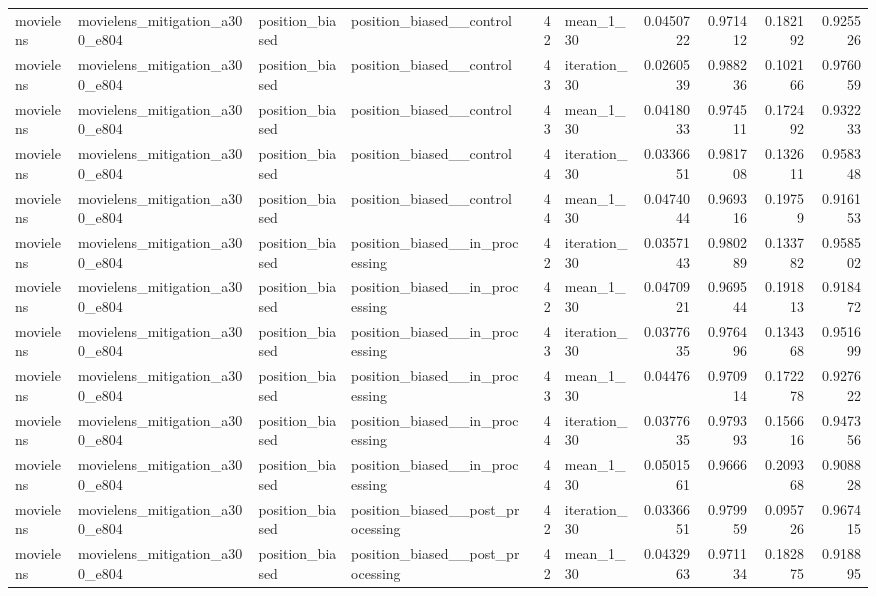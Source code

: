 \begin{table}[htbp!]
\begin{tabular}{llllrlrrrr}
movielens & movielens\_mitigation\_a300\_e804 & position\_biased & position\_biased\_\_control & 42 & mean\_1\_30 & 0.0450722 & 0.971412 & 0.182192 & 0.925526 \\
movielens & movielens\_mitigation\_a300\_e804 & position\_biased & position\_biased\_\_control & 43 & iteration\_30 & 0.0260539 & 0.988236 & 0.102166 & 0.976059 \\
movielens & movielens\_mitigation\_a300\_e804 & position\_biased & position\_biased\_\_control & 43 & mean\_1\_30 & 0.0418033 & 0.974511 & 0.172492 & 0.932233 \\
movielens & movielens\_mitigation\_a300\_e804 & position\_biased & position\_biased\_\_control & 44 & iteration\_30 & 0.0336651 & 0.981708 & 0.132611 & 0.958348 \\
movielens & movielens\_mitigation\_a300\_e804 & position\_biased & position\_biased\_\_control & 44 & mean\_1\_30 & 0.0474044 & 0.969316 & 0.19759 & 0.916153 \\
movielens & movielens\_mitigation\_a300\_e804 & position\_biased & position\_biased\_\_in\_processing & 42 & iteration\_30 & 0.0357143 & 0.980289 & 0.133782 & 0.958502 \\
movielens & movielens\_mitigation\_a300\_e804 & position\_biased & position\_biased\_\_in\_processing & 42 & mean\_1\_30 & 0.0470921 & 0.969544 & 0.191813 & 0.918472 \\
movielens & movielens\_mitigation\_a300\_e804 & position\_biased & position\_biased\_\_in\_processing & 43 & iteration\_30 & 0.0377635 & 0.976496 & 0.134368 & 0.951699 \\
movielens & movielens\_mitigation\_a300\_e804 & position\_biased & position\_biased\_\_in\_processing & 43 & mean\_1\_30 & 0.04476 & 0.970914 & 0.172278 & 0.927622 \\
movielens & movielens\_mitigation\_a300\_e804 & position\_biased & position\_biased\_\_in\_processing & 44 & iteration\_30 & 0.0377635 & 0.979393 & 0.156616 & 0.947356 \\
movielens & movielens\_mitigation\_a300\_e804 & position\_biased & position\_biased\_\_in\_processing & 44 & mean\_1\_30 & 0.0501561 & 0.9666 & 0.209368 & 0.908828 \\
movielens & movielens\_mitigation\_a300\_e804 & position\_biased & position\_biased\_\_post\_processing & 42 & iteration\_30 & 0.0336651 & 0.979959 & 0.095726 & 0.967415 \\
movielens & movielens\_mitigation\_a300\_e804 & position\_biased & position\_biased\_\_post\_processing & 42 & mean\_1\_30 & 0.0432963 & 0.971134 & 0.182875 & 0.918895 \\

\end{tabular}
\end{table}
